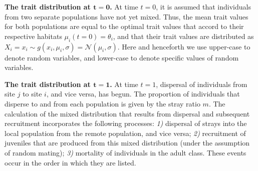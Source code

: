\documentclass{revtex4}
\begin{document}
{\bf The trait distribution at $\bm{t=0}$.} At time $t=0$, it is assumed that individuals from two separate populations have not yet mixed. 
Thus, the mean trait values for both populations are equal to the optimal trait values that accord to their respective habitats $\mu_i(t=0) = \theta_i$, and that their trait values are distributed as $X_i=x_i \sim g(x_i,\mu_i,\sigma) = \mathcal{N}(\mu_i,\sigma)$.
Here and henceforth we use upper-case to denote random variables, and lower-case to denote specific values of random variables.

{\bf The trait distribution at $\bm{t=1}$.} At time $t=1$, dispersal of individuals from site $j$ to site $i$, and vice versa, has begun.
The proportion of individuals that disperse to and from each population is given by the stray ratio $m$.
The calculation of the mixed distribution that results from dispersal and subsequent recruitment incorporates the following processes:
\emph{1)} dispersal of strays into the local population from the remote population, and vice versa;
\emph{2)} recruitment of juveniles that are produced from this mixed distribution (under the assumption of random mating); 
\emph{3)} mortality of individuals in the adult class.
These events occur in the order in which they are listed.
\end{document}
